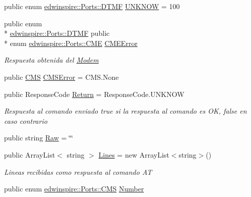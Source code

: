 \begin{DoxyCompactItemize}
\item 
public enum \hyperlink{namespaceedwinspire_1_1_ports_af4e0ec730b70610713b98825eb7c6f53}{edwinspire\-::\-Ports\-::\-D\-T\-M\-F} \hyperlink{namespaceedwinspire_1_1_ports_a6d3970cfb8b14fc4c7c0682aefaecb11}{U\-N\-K\-N\-O\-W} = 100
\item 
public enum \\*
\hyperlink{namespaceedwinspire_1_1_ports_af4e0ec730b70610713b98825eb7c6f53}{edwinspire\-::\-Ports\-::\-D\-T\-M\-F} public \\*
enum \hyperlink{namespaceedwinspire_1_1_ports_ace89e61880474073c93815c34c52fe0d}{edwinspire\-::\-Ports\-::\-C\-M\-E} \hyperlink{namespaceedwinspire_1_1_ports_a6e1a116e42ac0d9aa022553ffbd3d841}{C\-M\-E\-Error}
\begin{DoxyCompactList}\small\item\em Respuesta obtenida del \hyperlink{classedwinspire_1_1_ports_1_1_modem}{Modem} \end{DoxyCompactList}\item 
public \hyperlink{namespaceedwinspire_1_1_ports_aa6e4441b65db895e600a13038b3d5ff4}{C\-M\-S} \hyperlink{namespaceedwinspire_1_1_ports_aacf05e654cc931a34f76bbcffe360339}{C\-M\-S\-Error} = C\-M\-S.\-None
\item 
public Response\-Code \hyperlink{namespaceedwinspire_1_1_ports_a8b086f30ecfbef96ca3e5f5642767975}{Return} = Response\-Code.\-U\-N\-K\-N\-O\-W
\begin{DoxyCompactList}\small\item\em Respuesta al comando enviado true si la respuesta al comando es O\-K, false en caso contrario \end{DoxyCompactList}\item 
public string \hyperlink{namespaceedwinspire_1_1_ports_afeb780627bc31cc4b50e998eaf2fb6f0}{Raw} = \char`\"{}\char`\"{}
\item 
public Array\-List$<$ string $>$ \hyperlink{namespaceedwinspire_1_1_ports_a6989ba34677ae553d4d312c9ae744532}{Lines} = new Array\-List$<$string$>$()
\begin{DoxyCompactList}\small\item\em Lineas recibidas como respuesta al comando A\-T \end{DoxyCompactList}\item 
public enum \hyperlink{namespaceedwinspire_1_1_ports_aa6e4441b65db895e600a13038b3d5ff4}{edwinspire\-::\-Ports\-::\-C\-M\-S} \hyperlink{namespaceedwinspire_1_1_ports_a22f616818dc85fd8ee4b9f3821546acb}{Number}
\item 

\end{DoxyCompactItemize}
